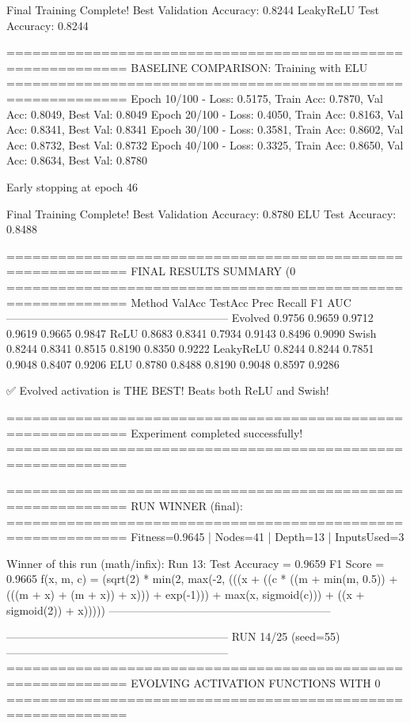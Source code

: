 Final Training Complete!
Best Validation Accuracy: 0.8244
LeakyReLU Test Accuracy: 0.8244

============================================================
BASELINE COMPARISON: Training with ELU
============================================================
Epoch  10/100 - Loss: 0.5175, Train Acc: 0.7870, Val Acc: 0.8049, Best Val: 0.8049
Epoch  20/100 - Loss: 0.4050, Train Acc: 0.8163, Val Acc: 0.8341, Best Val: 0.8341
Epoch  30/100 - Loss: 0.3581, Train Acc: 0.8602, Val Acc: 0.8732, Best Val: 0.8732
Epoch  40/100 - Loss: 0.3325, Train Acc: 0.8650, Val Acc: 0.8634, Best Val: 0.8780

Early stopping at epoch 46

Final Training Complete!
Best Validation Accuracy: 0.8780
ELU Test Accuracy: 0.8488

============================================================
FINAL RESULTS SUMMARY (0%
============================================================
Method             ValAcc     TestAcc    Prec       Recall     F1         AUC
------------------------------------------------------------
Evolved            0.9756     0.9659     0.9712     0.9619     0.9665     0.9847
ReLU               0.8683     0.8341     0.7934     0.9143     0.8496     0.9090
Swish              0.8244     0.8341     0.8515     0.8190     0.8350     0.9222
LeakyReLU          0.8244     0.8244     0.7851     0.9048     0.8407     0.9206
ELU                0.8780     0.8488     0.8190     0.9048     0.8597     0.9286

✅ Evolved activation is THE BEST! Beats both ReLU and Swish!

============================================================
Experiment completed successfully!
============================================================

============================================================
RUN WINNER (final):
============================================================
Fitness=0.9645 | Nodes=41 | Depth=13 | InputsUsed=3

Winner of this run (math/infix):
  Run 13:
     Test Accuracy = 0.9659
     F1 Score      = 0.9665
     f(x, m, c)    = (sqrt(2) * min(2, max(-2, (((x + ((c * ((m + min(m, 0.5)) + (((m + x) + (m + x)) + x))) + exp(-1))) + max(x, sigmoid(c))) + ((x + sigmoid(2)) + x)))))
------------------------------------------------------------

------------------------------------------------------------
RUN 14/25 (seed=55)
------------------------------------------------------------
============================================================
EVOLVING ACTIVATION FUNCTIONS
WITH 0%
============================================================

